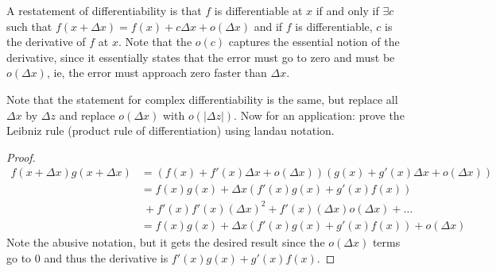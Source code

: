 \documentclass[11pt,leqno,oneside]{amsart}
\numberwithin{thm}{section}
\begin{document}
    \begin{defn}
        A restatement of differentiability is that $f$ is differentiable at $x$
        if and only if $\exists c$ such that $f(x+\Delta x) = f(x) + c \Delta x
        + o(\Delta x)$ and if $f$ is differentiable, $c$ is the derivative of
        $f$ at $x$. Note that the $o(c)$ captures the essential notion of the
        derivative, since it essentially states that the error must go to zero
        and must be $o(\Delta x)$, ie, the error must approach zero faster than
        $\Delta x$.
    \end{defn}
    Note that the statement for complex differentiability is the same, but
    replace all $\Delta x$ by $\Delta z$ and replace $o(\Delta x)$ with $o(|
    \Delta z|)$. Now for an application: prove the Leibniz rule (product rule
    of differentiation) using landau notation.
    \begin{proof}
        \begin{align*}
            f(x+\Delta x)g(x+\Delta x) & = (f(x)+f'(x)\Delta x + o(\Delta
            x))(g(x)+g'(x) \Delta x + o(\Delta x)) \\
            \ & = f(x)g(x) + \Delta x(f'(x)g(x)+g'(x)f(x)) \\
            \ & \ + f'(x)f'(x)(\Delta
            x)^2 + f'(x)(\Delta x)o(\Delta x) + \dots \\
            & = f(x)g(x) + \Delta x(f'(x)g(x) + g'(x)f(x)) + o(\Delta x)
        \end{align*}
        Note the abusive notation, but it gets the desired result since the
        $o(\Delta x)$ terms go to 0 and thus the derivative is
        $f'(x)g(x)+g'(x)f(x)$.
    \end{proof}
\end{document}
